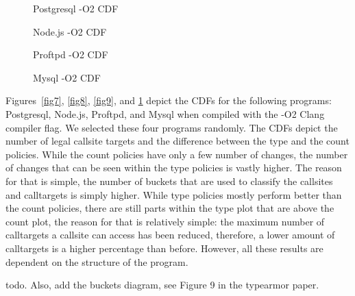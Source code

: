 \begin{figure}[h] 
  \begin{minipage}[b]{0.5\linewidth}
    \centering
    \resizebox{1.04\columnwidth}{!}{}
    \caption{Postgresql -O2 CDF} 
    \label{fig7} 
    \vspace{1ex}
  \end{minipage}%
  \begin{minipage}[b]{0.5\linewidth}
    \centering
    \resizebox{1.04\columnwidth}{!}{} 
    \caption{Node.js -O2 CDF} 
    \label{fig8} 
    \vspace{1ex}
  \end{minipage} 
  \begin{minipage}[b]{0.5\linewidth}
    \centering
    \resizebox{1.04\columnwidth}{!}{}
    \caption{Proftpd -O2 CDF} 
    \label{fig9} 
    \vspace{1ex}
  \end{minipage}%
  \begin{minipage}[b]{0.5\linewidth}
    \centering
    \resizebox{1.04\columnwidth}{!}{} 
    \caption{Mysql -O2 CDF} 
    \label{fig10} 
    \vspace{1ex}
  \end{minipage} 
\end{figure}
Figures~\ref{fig7}, \ref{fig8}, \ref{fig9}, and \ref{fig10} depict the CDFs for the following programs: Postgresql, Node.js, Proftpd, and Mysql when compiled with the 
-O2 Clang compiler flag.
We selected these four programs randomly.
The CDFs depict the number of legal callsite targets and the difference between the type and the count policies. 
While the count  policies have only a few number of changes, the number of changes 
that can be seen within the type policies is vastly higher. The reason for that is 
simple, the number of buckets that are used to classify the callsites and calltargets 
is simply higher. While type policies mostly perform better than the count policies, 
there are still parts within the type plot that are above the count plot, the reason 
for that is relatively simple: the maximum number of calltargets a callsite can access 
has been reduced, therefore, a lower amount of calltargets is a higher percentage than 
before. However, all these results are dependent on the structure of the program.

todo. Also, add the buckets diagram, see Figure 9 in the typearmor paper.

